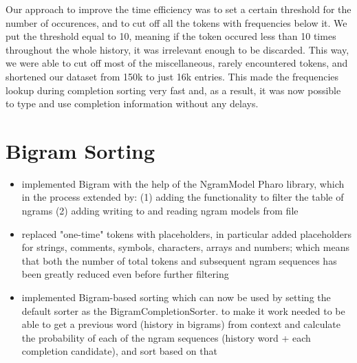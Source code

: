 Our approach to improve the time efficiency was to set a certain threshold for the number of occurences, and to cut off all the tokens with frequencies below it. We put the threshold equal to 10, meaning if the token occured less than 10 times throughout the whole history, it was irrelevant enough to be discarded. This way, we were able to cut off most of the miscellaneous, rarely encountered tokens, and shortened our dataset from 150k to just 16k entries. This made the frequencies lookup during completion sorting very fast and, as a result, it was now possible to type and use completion information without any delays.

\section{Bigram Sorting}
\begin{itemize}
    \item implemented Bigram with the help of the NgramModel Pharo library, which in the process extended by: (1) adding the functionality to filter the table of ngrams (2) adding writing to and reading ngram models from file
    \item replaced "one-time" tokens with placeholders, in particular added placeholders for strings, comments, symbols, characters, arrays and numbers; which means that both the number of total tokens and subsequent ngram sequences has been greatly reduced even before further filtering
    \item implemented Bigram-based sorting which can now be used by setting the default sorter as the BigramCompletionSorter. to make it work needed to be able to get a previous word (history in bigrams) from context and calculate the probability of each of the ngram sequences (history word + each completion candidate), and sort based on that
\end{itemize}